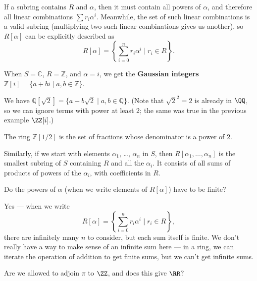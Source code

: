 If a subring contains $R$ and $\alpha$, then it must contain all powers of $\alpha$, and therefore all linear combinations $\sum r_i\alpha^i$. Meanwhile, the set of such linear combinations is a valid subring (multiplying two such linear combinations gives us another), so $R[\alpha]$ can be explicitly described as \[R[\alpha] = \left\{\sum_{i = 0}^n r_i\alpha^i \mid r_i \in R\right\}.\] 

\begin{example}
    When $S = \mathbb{C}$, $R = \mathbb{Z}$, and $\alpha = i$, we get the \textbf{Gaussian integers} $\mathbb{Z}[i] = \{a + bi \mid a, b \in \mathbb{Z}\}$. 
\end{example}

\begin{example}
    We have $\mathbb{Q}[\sqrt{2}] = \{a + b\sqrt{2} \mid a, b \in \mathbb{Q}\}$. (Note that $\sqrt{2}^2 = 2$ is already in $\QQ$, so we can ignore terms with power at least $2$; the same was true in the previous example $\ZZ[i]$.)
\end{example}

\begin{example}
    The ring $\mathbb{Z}[1/2]$ is the set of fractions whose denominator is a power of $2$. 
\end{example}

Similarly, if we start with elements $\alpha_1$, \ldots, $\alpha_n$ in $S$, then $R[\alpha_1, \ldots, \alpha_n]$ is the smallest subring of $S$ containing $R$ and all the $\alpha_i$. It consists of all sums of products of powers of the $\alpha_i$, with coefficients in $R$. 

\begin{question}
Do the powers of $\alpha$ (when we write elements of $R[\alpha]$) have to be finite? 
\end{question}

\begin{ans}
Yes --- when we write \[R[\alpha] = \left\{\sum_{i = 0}^n r_i\alpha^i \mid r_i \in R\right\},\] there are infinitely many $n$ to consider, but each sum itself is finite. We don't really have a way to make sense of an infinite sum here --- in a ring, we can iterate the operation of addition to get finite sums, but we can't get infinite sums.
\end{ans}

\begin{question}
Are we allowed to adjoin $\pi$ to $\ZZ$, and does this give $\RR$?
\end{question}


